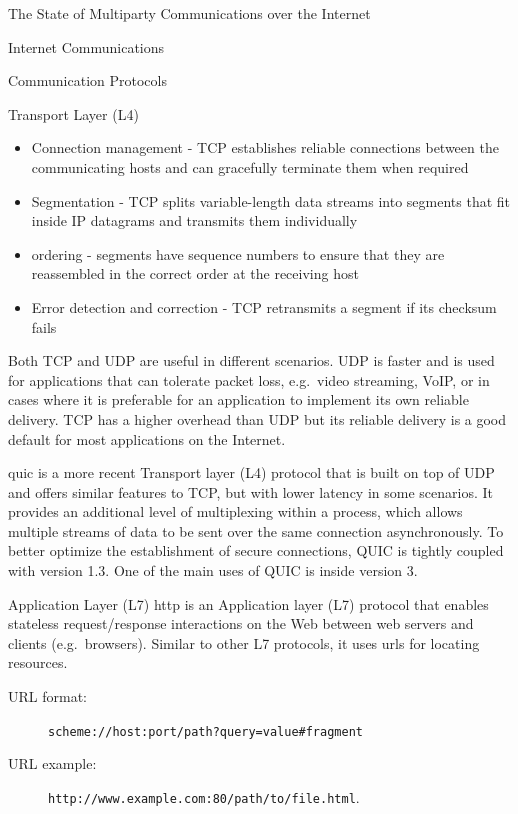 \begin{frame}[fragile]{The State of Multiparty Communications over the Internet}
\begin{block}{Internet Communications}
\begin{block}{Communication Protocols}
\begin{block}{Transport Layer (L4)}
\begin{itemize}
\tightlist
\item
  Connection management - TCP establishes reliable connections between the communicating hosts and can gracefully terminate them when required
\item
  Segmentation - TCP splits variable-length data streams into segments that fit inside IP datagrams and transmits them individually
\item
  ordering - segments have sequence numbers to ensure that they are reassembled in the correct order at the receiving host
\item
  Error detection and correction - TCP retransmits a segment if its checksum fails
\end{itemize}

Both TCP and UDP are useful in different scenarios. UDP is faster and is used for applications that can tolerate packet loss, e.g.~video streaming, VoIP, or in cases where it is preferable for an application to implement its own reliable delivery. TCP has a higher overhead than UDP but its reliable delivery is a good default for most applications on the Internet.

\gls{quic} is a more recent Transport layer (L4) protocol that is built on top of UDP and offers similar features to TCP, but with lower latency in some scenarios. It provides an additional level of multiplexing within a process, which allows multiple streams of data to be sent over the same connection asynchronously. To better optimize the establishment of secure connections, QUIC is tightly coupled with  version 1.3. One of the main uses of QUIC is inside  version 3.
\end{block}

\begin{block}{Application Layer (L7)}
\label{thesis__020-internet.md__application-layer-l7}
\gls{http} is an Application layer (L7) protocol that enables stateless request/response interactions on the Web between web servers and clients (e.g.~browsers). Similar to other L7 protocols, it uses \glspl{url} for locating resources.

\begin{description}
\item[URL format:]
\texttt{scheme://host:port/path?query=value\#fragment}
\item[URL example:]
\texttt{http://www.example.com:80/path/to/file.html}.
\end{description}


\end{block}
\end{block}
\end{block}
\end{frame}
